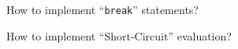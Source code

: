 \begin{frame}
  \begin{center}

    \vspace{0.50cm}
    How to implement ``\texttt{break}'' statements?
  \end{center}
\end{frame}

\begin{frame}
  \begin{center}

    \vspace{0.20cm}
    How to implement ``Short-Circuit'' evaluation?
  \end{center}
\end{frame}
